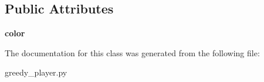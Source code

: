 \subsection*{Public Attributes}
\begin{DoxyCompactItemize}
\item 
\hypertarget{class_tabuleiro_othello-fork_1_1models_1_1players_1_1greedy__player_1_1_greedy_player_a4c678d6cdcbe6443de9d4591f65a4ca5}{}{\bfseries color}\label{class_tabuleiro_othello-fork_1_1models_1_1players_1_1greedy__player_1_1_greedy_player_a4c678d6cdcbe6443de9d4591f65a4ca5}

\end{DoxyCompactItemize}


The documentation for this class was generated from the following file\+:\begin{DoxyCompactItemize}
\item 
greedy\+\_\+player.\+py\end{DoxyCompactItemize}
